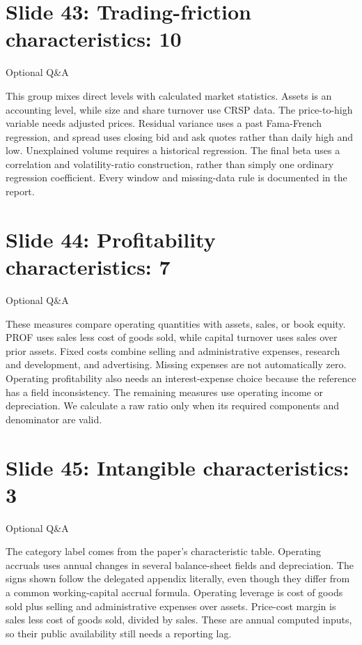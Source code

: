 \documentclass[11pt]{article}
\begin{document}
\section*{Slide 43: Trading-friction characteristics: 10}

\textcolor{SBred}{Optional Q\&A}

This group mixes direct levels with calculated market statistics. Assets is an accounting level, while size and share turnover use CRSP data. The price-to-high variable needs adjusted prices. Residual variance uses a past Fama-French regression, and spread uses closing bid and ask quotes rather than daily high and low. Unexplained volume requires a historical regression. The final beta uses a correlation and volatility-ratio construction, rather than simply one ordinary regression coefficient. Every window and missing-data rule is documented in the report.

\section*{Slide 44: Profitability characteristics: 7}

\textcolor{SBred}{Optional Q\&A}

These measures compare operating quantities with assets, sales, or book equity. PROF uses sales less cost of goods sold, while capital turnover uses sales over prior assets. Fixed costs combine selling and administrative expenses, research and development, and advertising. Missing expenses are not automatically zero. Operating profitability also needs an interest-expense choice because the reference has a field inconsistency. The remaining measures use operating income or depreciation. We calculate a raw ratio only when its required components and denominator are valid.

\section*{Slide 45: Intangible characteristics: 3}

\textcolor{SBred}{Optional Q\&A}

The category label comes from the paper's characteristic table. Operating accruals uses annual changes in several balance-sheet fields and depreciation. The signs shown follow the delegated appendix literally, even though they differ from a common working-capital accrual formula. Operating leverage is cost of goods sold plus selling and administrative expenses over assets. Price-cost margin is sales less cost of goods sold, divided by sales. These are annual computed inputs, so their public availability still needs a reporting lag.
\end{document}
